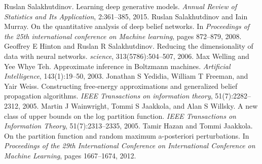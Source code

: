 \begin{chapterreferences}
 Ruslan Salakhutdinov. Learning deep generative models. \emph{Annual Review of Statistics and Its Application}, 2:361–385, 2015.
 Ruslan Salakhutdinov and Iain Murray. On the quantitative analysis of deep belief networks. In \emph{Proceedings of the 25th international conference on Machine learning}, pages 872–879, 2008.
 Geoffrey E Hinton and Ruslan R Salakhutdinov. Reducing the dimensionality of data with neural networks. \emph{science}, 313(5786):504–507, 2006.
 Max Welling and Yee Whye Teh. Approximate inference in Boltzmann machines. \emph{Artificial Intelligence}, 143(1):19–50, 2003.
 Jonathan S Yedidia, William T Freeman, and Yair Weiss. Constructing free-energy approximations and generalized belief propagation algorithms. \emph{IEEE Transactions on information theory}, 51(7):2282–2312, 2005.
 Martin J Wainwright, Tommi S Jaakkola, and Alan S Willsky. A new class of upper bounds on the log partition function. \emph{IEEE Transactions on Information Theory}, 51(7):2313–2335, 2005.
 Tamir Hazan and Tommi Jaakkola. On the partition function and random maximum a-posteriori perturbations. In \emph{Proceedings of the 29th International Conference on International Conference on Machine Learning}, pages 1667–1674, 2012.
\end{chapterreferences}
